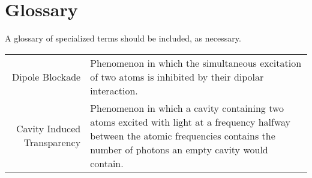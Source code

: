 \chapter*{Glossary} 

A glossary of specialized terms should be included, as necessary.

\begin{center}
\begin{longtable}{r p{}}
Dipole Blockade & Phenomenon in which the simultaneous excitation of two atoms is inhibited by their dipolar interaction. \\
Cavity Induced Transparency & Phenomenon in which a cavity containing two atoms excited with light at a frequency halfway between the atomic frequencies contains the number of photons an empty cavity would contain.  \\ 
\end{longtable}
\end{center}
